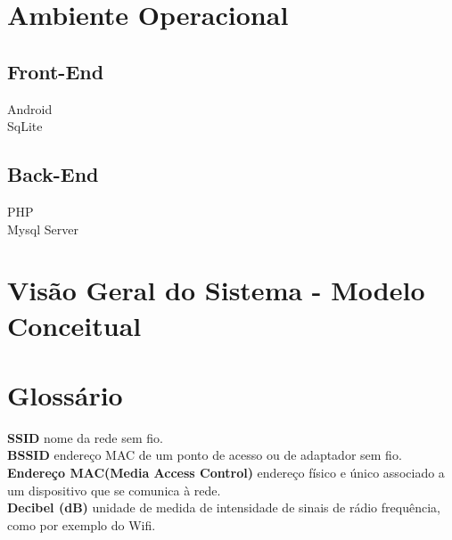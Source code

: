 \documentclass[12pt]{article}
\begin{document}
\section*{Ambiente Operacional}
\subsection*{Front-End}
	Android\\
	SqLite\\
\subsection*{Back-End}
	PHP\\
	Mysql Server\\
	

\section*{Visão Geral do Sistema - Modelo Conceitual}

\section*{Glossário}
\textbf{SSID }nome da rede sem fio.\\
\textbf{BSSID } endereço MAC de um ponto de acesso ou de adaptador sem fio.\\
\textbf{Endereço MAC(Media Access Control) } endereço físico e único associado a um dispositivo que se comunica à rede.\\
\textbf{Decibel (dB) }unidade de medida de intensidade de sinais de rádio frequência, como por exemplo do Wifi.\\



\end{document}
